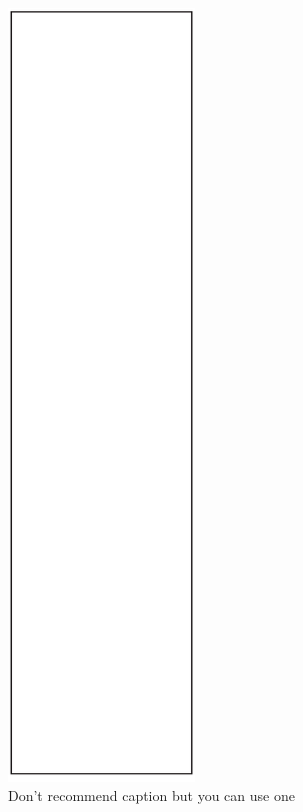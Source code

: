 \begin{minipage}[t]{504pt}
\begin{minipage}[t]{350pt}
\end{minipage}
\hspace{13pt}\begin{minipage}[t]{140pt}
\begin{figure}[H]
\vspace{10pt}
\includegraphics[width=140pt]{pic/p1.pdf}
\vspace{-10pt}
\caption{Don't recommend caption but you can use one}
\end{figure}
\end{minipage}
\end{minipage}



